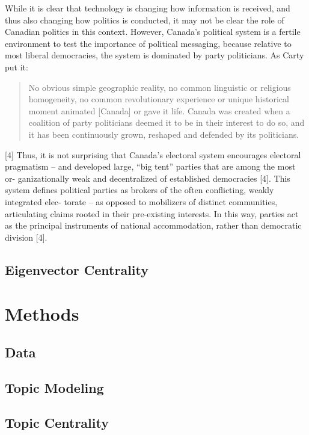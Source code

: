 \documentclass{nws}
\begin{document}
While it is clear that technology is changing how information is received, and
thus also changing how politics is conducted, it may not be clear the role of
Canadian politics in this context. However, Canada’s political system is a
fertile environment to test the importance of political messaging, because
relative to most liberal democracies, the system is dominated by party
politicians. As Carty put it: 
\begin{quote}
  No obvious simple geographic reality, no common
linguistic or religious homogeneity, no common revolutionary experience or
unique historical moment animated [Canada] or gave it life. Canada was created
when a coalition of party politicians deemed it to be in their interest to do
so, and it has been continuously grown, reshaped and defended by its
politicians.
\end{quote}
 [4] Thus, it is not surprising that Canada’s electoral system
encourages electoral pragmatism – and developed large, “big tent” parties that
are among the most or- ganizationally weak and decentralized of established
democracies [4]. This system defines political parties as brokers of the often
conflicting, weakly integrated elec- torate – as opposed to mobilizers of
distinct communities, articulating claims rooted in their pre-existing
interests. In this way, parties act as the principal instruments of national
accommodation, rather than democratic division [4].


\subsection{Eigenvector Centrality}

\section{Methods}

\subsection{Data}

\subsection{Topic Modeling}

\subsection{Topic Centrality}
\end{document}

